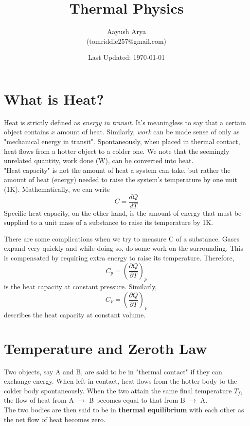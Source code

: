 \documentclass{article}
\title{Thermal Physics}
\author{Aayush Arya\\ (tomriddle257@gmail.com)}
\date{Last Updated: \today}
\begin{document}
	
	\maketitle
	
	\section{What is Heat?}
	Heat is strictly defined as \textit{energy in transit}. It's meaningless to say that a certain object contains $x$ amount of heat. Similarly, \textit{work} can be made sense of only as "mechanical energy in transit". Spontaneously, when placed in thermal contact, heat flows from a hotter object to a colder one. We note that the seemingly unrelated quantity, work done (W), can be converted into heat. \\
	
	"Heat capacity" is not the amount of heat a system can take, but rather the amount of heat (energy) needed to raise the system's temperature by one unit (1K). Mathematically, we can write
	$$ C = \frac{dQ}{dT}$$
	Specific heat capacity, on the other hand, is the amount of energy that must be supplied to a unit mass of a substance to raise its temperature by 1K.
	
	There are some complications when we try to measure C of a substance. Gases expand very quickly and while doing so, do some work on the surrounding. This is compensated by requiring extra energy to raise its temperature. Therefore,
	$$ C_p = \left(\frac{\partial Q}{\partial T}\right)_p $$
	is the heat capacity at constant pressure. Similarly,
	\begin{equation*}
	C_V = \left(\frac{\partial Q}{\partial T}\right)_V
	\end{equation*}
	 describes the heat capacity at constant volume.
	 
	 \section{Temperature and Zeroth Law}
	 Two objects, say A and B, are said to be in "thermal contact" if they can exchange energy. When left in contact, heat flows from the hotter body to the colder body spontaneously. When the two attain the same final temperature $T_f$, the flow of heat from A $\rightarrow$ B becomes equal to that from B $\rightarrow$ A.\\
	 The two bodies are then said to be in \textbf{thermal equilibrium} with each other as the net flow of heat becomes zero. \\
	 
\end{document}
